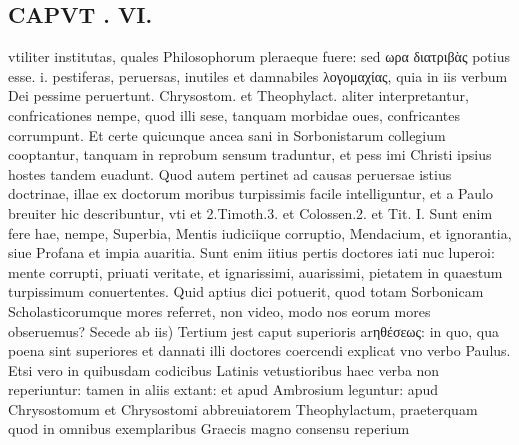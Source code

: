 \documentclass{article}
\begin{document}
\begin{pages}
\section*{CAPVT . VI. }
\marginpar{[ p.429 ]}\pstart vtiliter institutas, quales Philosophorum pleraeque fuere: sed ωρα διατριβὰς potius esse. i. pestiferas, peruersas, inutiles et damnabiles λογομαχίας, quia in iis verbum Dei pessime peruertunt. Chrysostom. et Theophylact. aliter interpretantur, confricationes nempe, quod illi sese, tanquam morbidae oues, confricantes corrumpunt. Et certe quicunque ancea sani in Sorbonistarum collegium cooptantur, tanquam in reprobum sensum traduntur, et pess imi Christi ipsius hostes tandem euadunt.  \pend\pstart Quod autem pertinet ad causas peruersae istius doctrinae, illae ex doctorum moribus turpissimis facile intelliguntur, et a Paulo breuiter hic describuntur, vti et 2.Timoth.3. et Colossen.2. et Tit. I. Sunt enim fere hae, nempe, Superbia, Mentis iudiciique corruptio, Mendacium, et ignorantia, siue Profana et impia auaritia. Sunt enim iitius pertis doctores iati nuc luperoi: mente corrupti, priuati veritate, et ignarissimi, auarissimi, pietatem in quaestum turpissimum conuertentes. Quid aptius dici potuerit, quod totam Sorbonicam Scholasticorumque  mores referret, non video, modo nos eorum mores obseruemus?  \pend\pstart Secede ab iis) Tertium jest caput superioris arηθέσεως: in quo, qua poena sint superiores et dannati illi doctores coercendi explicat vno verbo Paulus. Etsi vero in quibusdam codicibus Latinis vetustioribus haec verba non reperiuntur: tamen in aliis extant: et apud Ambrosium leguntur: apud Chrysostomum et Chrysostomi abbreuiatorem Theophylactum, praeterquam quod in omnibus exemplaribus Graecis magno consensu reperium\pend

\end{pages}
\end{document}

